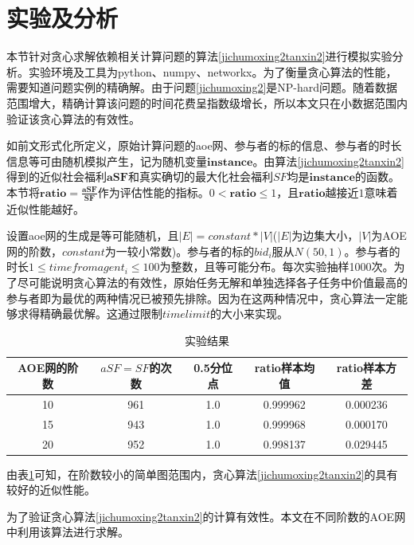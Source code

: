 \documentclass[promaster]{thesis-uestc}
\begin{document}


\section{实验及分析}

本节针对贪心求解依赖相关计算问题的算法\ref{jichumoxing2tanxin2}进行模拟实验分析。实验环境及工具为python、numpy、networkx。为了衡量贪心算法的性能，需要知道问题实例的精确解。由于问题\ref{jichumoxing2}是NP-hard问题。随着数据范围增大，精确计算该问题的时间花费呈指数级增长，所以本文只在小数据范围内验证该贪心算法的有效性。

如前文形式化所定义，原始计算问题的aoe网、参与者的标的信息、参与者的时长信息等可由随机模拟产生，记为随机变量$\mathbf{instance}$。由算法\ref{jichumoxing2tanxin2}得到的近似社会福利$\mathbf{aSF}$和真实确切的最大化社会福利$SF$均是$\mathbf{instance}$的函数。本节将$\mathbf{ratio} = \frac{\mathbf{aSF}}{\mathbf{SF}}$作为评估性能的指标。$0<\mathbf{ratio} \leq 1$，且$\mathbf{ratio}$越接近$1$意味着近似性能越好。

设置aoe网的生成是等可能随机，且$|E|=constant*|V|$($|E|$为边集大小，$|V|$为AOE网的阶数，$constant$为一较小常数)。参与者的标的$bid_i$服从$N(50,1)$。参与者的时长$1\leq timefromagent_i\leq 100$为整数，且等可能分布。每次实验抽样1000次。为了尽可能说明贪心算法的有效性，原始任务无解和单独选择各子任务中价值最高的参与者即为最优的两种情况已被预先排除。因为在这两种情况中，贪心算法一定能够求得精确最优解。这通过限制$timelimit$的大小来实现。

\begin{table}[h]
\caption{实验结果}
\label{jinsizhibiao}
\begin{tabular}{ccccc}
    \toprule
    AOE网的阶数&$aSF=SF$的次数&0.5分位点&ratio样本均值&ratio样本方差\\
    \midrule
    10&961&1.0&0.999962&0.000236\\
    15&943&1.0&0.999968&0.000170\\
    20&952&1.0&0.998137&0.029445\\
    \bottomrule
\end{tabular}
\end{table}

由表\ref{jinsizhibiao}可知，在阶数较小的简单图范围内，贪心算法\ref{jichumoxing2tanxin2}的具有较好的近似性能。

为了验证贪心算法\ref{jichumoxing2tanxin2}的计算有效性。本文在不同阶数的AOE网中利用该算法进行求解。
\end{document}

